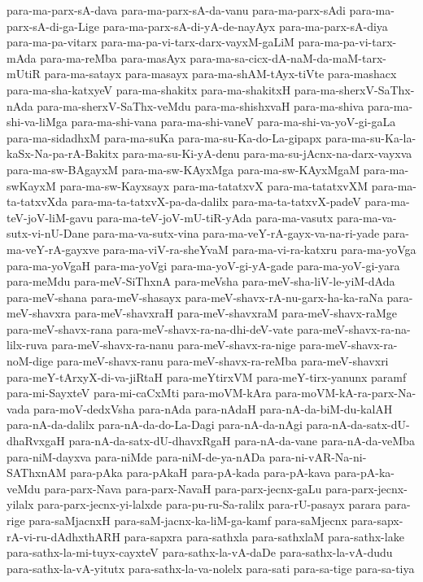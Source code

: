 {para-ma-parx-sA-dava
para-ma-parx-sA-da-vanu
para-ma-parx-sAdi
para-ma-parx-sA-di-ga-Lige
para-ma-parx-sA-di-yA-de-nayAyx
para-ma-parx-sA-diya
para-ma-pa-vitarx
para-ma-pa-vi-tarx-darx-vayxM-gaLiM
para-ma-pa-vi-tarx-mAda
para-ma-reMba
para-masAyx
para-ma-sa-cicx-dA-naM-da-maM-tarx-mUtiR
para-ma-satayx
para-masayx
para-ma-shAM-tAyx-tiVte
para-mashacx
para-ma-sha-katxyeV
para-ma-shakitx
para-ma-shakitxH
para-ma-sherxV-SaThx-nAda
para-ma-sherxV-SaThx-veMdu
para-ma-shishxvaH
para-ma-shiva
para-ma-shi-va-liMga
para-ma-shi-vana
para-ma-shi-vaneV
para-ma-shi-va-yoV-gi-gaLa
para-ma-sidadhxM
para-ma-suKa
para-ma-su-Ka-do-La-gipapx
para-ma-su-Ka-la-kaSx-Na-pa-rA-Bakitx
para-ma-su-Ki-yA-denu
para-ma-su-jAcnx-na-darx-vayxva
para-ma-sw-BAgayxM
para-ma-sw-KAyxMga
para-ma-sw-KAyxMgaM
para-ma-swKayxM
para-ma-sw-Kayxsayx
para-ma-tatatxvX
para-ma-tatatxvXM
para-ma-ta-tatxvXda
para-ma-ta-tatxvX-pa-da-dalilx
para-ma-ta-tatxvX-padeV
para-ma-teV-joV-liM-gavu
para-ma-teV-joV-mU-tiR-yAda
para-ma-vasutx
para-ma-va-sutx-vi-nU-Dane
para-ma-va-sutx-vina
para-ma-veY-rA-gayx-va-na-ri-yade
para-ma-veY-rA-gayxve
para-ma-viV-ra-sheYvaM
para-ma-vi-ra-katxru
para-ma-yoVga
para-ma-yoVgaH
para-ma-yoVgi
para-ma-yoV-gi-yA-gade
para-ma-yoV-gi-yara
para-meMdu
para-meV-SiThxnA
para-meVsha
para-meV-sha-liV-le-yiM-dAda
para-meV-shana
para-meV-shasayx
para-meV-shavx-rA-nu-garx-ha-ka-raNa
para-meV-shavxra
para-meV-shavxraH
para-meV-shavxraM
para-meV-shavx-raMge
para-meV-shavx-rana
para-meV-shavx-ra-na-dhi-deV-vate
para-meV-shavx-ra-na-lilx-ruva
para-meV-shavx-ra-nanu
para-meV-shavx-ra-nige
para-meV-shavx-ra-noM-dige
para-meV-shavx-ranu
para-meV-shavx-ra-reMba
para-meV-shavxri
para-meY-tArxyX-di-va-jiRtaH
para-meYtirxVM
para-meY-tirx-yanunx
paramf
para-mi-SayxteV
para-mi-caCxMti
para-moVM-kAra
para-moVM-kA-ra-parx-Na-vada
para-moV-dedxVsha
para-nAda
para-nAdaH
para-nA-da-biM-du-kalAH
para-nA-da-dalilx
para-nA-da-do-La-Dagi
para-nA-da-nAgi
para-nA-da-satx-dU-dhaRvxgaH
para-nA-da-satx-dU-dhavxRgaH
para-nA-da-vane
para-nA-da-veMba
para-niM-dayxva
para-niMde
para-niM-de-ya-nADa
para-ni-vAR-Na-ni-SAThxnAM
para-pAka
para-pAkaH
para-pA-kada
para-pA-kava
para-pA-ka-veMdu
para-parx-Nava
para-parx-NavaH
para-parx-jecnx-gaLu
para-parx-jecnx-yilalx
para-parx-jecnx-yi-lalxde
para-pu-ru-Sa-ralilx
para-rU-pasayx
parara
para-rige
para-saMjacnxH
para-saM-jacnx-ka-liM-ga-kamf
para-saMjecnx
para-sapx-rA-vi-ru-dAdhxthARH
para-sapxra
para-sathxla
para-sathxlaM
para-sathx-lake
para-sathx-la-mi-tuyx-cayxteV
para-sathx-la-vA-daDe
para-sathx-la-vA-dudu
para-sathx-la-vA-yitutx
para-sathx-la-va-nolelx
para-sati
para-sa-tige
para-sa-tiya
}
